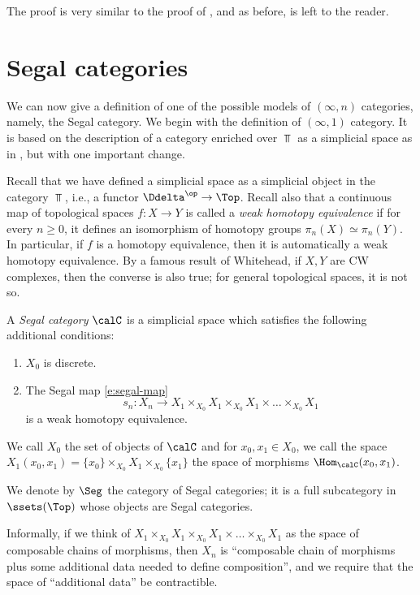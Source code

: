 The proof is very similar to the proof of , and as before, is
left to the reader.



\section{Segal categories}\label{s:segal-cat}
We can now give a definition of one of the possible models of $(\infty, n)$
categories, namely, the Segal category. We begin with the definition of
$(\infty, 1)$ category. It is based on the description of a category enriched
over $\Top$ as a simplicial space as in , but with one
important change.

Recall that we have defined a simplicial space as a simplicial object in the
category $\Top$, i.e., a functor $\Ddelta^\op\to \Top$. Recall also that a
continuous map of topological spaces $f\colon X\to Y$ is called a \emph{weak
homotopy equivalence} if for every $n\ge0$, it
defines an isomorphism of homotopy groups $\pi_n(X)\simeq \pi_n(Y)$. In
particular, if $f$ is a homotopy equivalence, then it is automatically a weak
homotopy equivalence. By a famous result of Whitehead, if $X,Y$ are CW
complexes, then the converse is also true; for general topological spaces, it is
not so.

\begin{definition}\label{d:segal-cat}
  A \emph{Segal category} $\calC$ is a simplicial space which satisfies the
  following additional conditions:
  \begin{enumerate}
    \item $X_0$ is discrete.
    \item The Segal map \eqref{e:segal-map}
      $$
        s_n \colon X_n \to
        X_1\times_{X_0} X_1\times_{X_0} X_1 \times\dots \times_{X_0} X_1
      $$
      is a weak homotopy equivalence.
  \end{enumerate}
  We call $X_0$ the set of objects of $\calC$ and for $x_0, x_1\in X_0$, we call
  the space $X_1(x_0, x_1) = \{x_0\}\times_{X_0} X_1 \times_{X_0}\{x_1\}$ the space of
  morphisms $\Hom_{\calC}(x_0, x_1)$.
\end{definition}

We denote by $\Seg$ the category of Segal categories; it is a full subcategory
in $\ssets(\Top)$ whose objects are Segal categories.

Informally, if we think of $X_1\times_{X_0} X_1\times_{X_0} X_1
\times\dots \times_{X_0} X_1$ as the space of composable chains of morphisms,
then $X_n$ is ``composable chain of morphisms plus some additional data needed
to define composition'', and we require that the space of ``additional data'' be
contractible.

